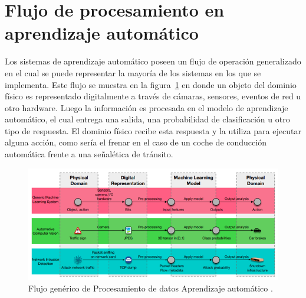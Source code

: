 \section{Flujo de procesamiento en aprendizaje automático}

Los sistemas de aprendizaje automático poseen un flujo de operación generalizado \parencite{r40} en el cual se puede representar la mayoría de los sistemas en los que se implementa. Este flujo se muestra en la figura~\ref{fig:flujo} en donde un objeto del dominio físico es representado digitalmente a través de cámaras, sensores, eventos de red u otro hardware. Luego la información es procesada en el modelo de aprendizaje automático, el cual entrega una salida, una probabilidad de clasificación u otro tipo de respuesta. El dominio físico recibe esta respuesta y la utiliza para ejecutar alguna acción, como sería el frenar en el caso de un coche de conducción automática frente a una señalética de tránsito. 

\begin{figure}[th]
\centering
\includegraphics [scale = 0.85]{Figures/figura_08.PNG}
\decoRule
\caption[Flujo genérico] {Flujo genérico de Procesamiento de datos Aprendizaje automático \parencite{r40}.}
\label{fig:flujo}
\end{figure}


